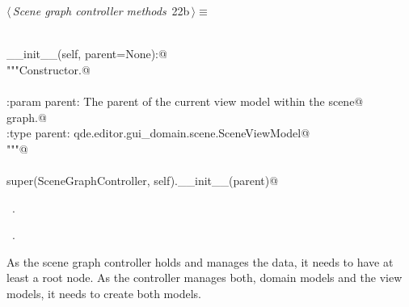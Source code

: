 \documentclass[
    a4paper,      %
    10pt,         %
    openright,    %
    notitlepage,  %
    parskip=half, %
]{scrreprt}       %
\theoremstyle{definition}                    %
\begin{document}
\begin{flushleft} \small
\begin{minipage}{\linewidth}\label{scrap15}\raggedright\small
{} $\langle\,${\itshape Scene graph controller methods}\nobreak\ {\footnotesize {22b}}$\,\rangle\equiv$
\vspace{-1ex}
\begin{list}{}{} \item
\mbox{}\lstinline@@\\
\mbox{}\lstinline@def __init__(self, parent=None):@\\
\mbox{}\lstinline@    """Constructor.@\\
\mbox{}\lstinline@@\\
\mbox{}\lstinline@    :param parent: The parent of the current view model within the scene@\\
\mbox{}\lstinline@                    graph.@\\
\mbox{}\lstinline@    :type parent:  qde.editor.gui_domain.scene.SceneViewModel@\\
\mbox{}\lstinline@    """@\\
\mbox{}\lstinline@@\\
\mbox{}\lstinline@    super(SceneGraphController, self).__init__(parent)@\\
\mbox{}\lstinline@@{\NWsep}
\end{list}
\vspace{-1.5ex}
\footnotesize
\begin{list}{}{\setlength{\itemsep}{-\parsep}\setlength{\itemindent}{-\leftmargin}}
\item \NWtxtMacroDefBy\ .
\item \NWtxtMacroRefIn\ .

\item{}
\end{list}
\end{minipage}\vspace{4ex}
\end{flushleft}
As the scene graph controller holds and manages the data, it needs to have at
least a root node. As the controller manages both, domain models and the view
models, it needs to create both models.
\end{document}
